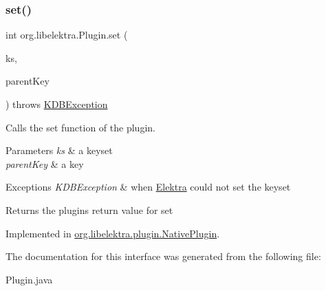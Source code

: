 \mbox{\label{interfaceorg_1_1libelektra_1_1Plugin_a650ce789086f5becf21c5f91fad4c42e}} 
\subsubsection{\texorpdfstring{set()}{set()}}
{\footnotesize\ttfamily int org.\+libelektra.\+Plugin.\+set (\begin{DoxyParamCaption}\item[{\hyperlink{classorg_1_1libelektra_1_1KeySet}{Key\+Set}}]{ks,  }\item[{\hyperlink{classorg_1_1libelektra_1_1Key}{Key}}]{parent\+Key }\end{DoxyParamCaption}) throws \hyperlink{classorg_1_1libelektra_1_1exception_1_1KDBException}{K\+D\+B\+Exception}}



Calls the set function of the plugin. 


\begin{DoxyParams}{Parameters}
{\em ks} & a keyset \\
\hline
{\em parent\+Key} & a key \\
\hline
\end{DoxyParams}

\begin{DoxyExceptions}{Exceptions}
{\em K\+D\+B\+Exception} & when \hyperlink{interfaceorg_1_1libelektra_1_1Elektra}{Elektra} could not set the keyset \\
\hline
\end{DoxyExceptions}
\begin{DoxyReturn}{Returns}
the plugin\textquotesingle{}s return value for set 
\end{DoxyReturn}


Implemented in \hyperlink{classorg_1_1libelektra_1_1plugin_1_1NativePlugin_a9faeb1e6eb90a4c90681eeeb097eeb53}{org.\+libelektra.\+plugin.\+Native\+Plugin}.



The documentation for this interface was generated from the following file\+:\begin{DoxyCompactItemize}
\item 
Plugin.\+java\end{DoxyCompactItemize}
